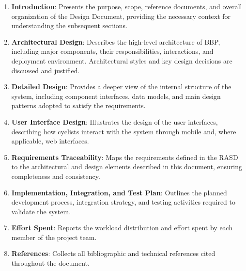 \begin{enumerate}
      \item \textbf{Introduction}: Presents the purpose, scope, reference documents, and
            overall organization of the Design Document, providing the necessary context
            for understanding the subsequent sections.
      \item \textbf{Architectural Design}: Describes the high-level architecture of BBP,
            including major components, their responsibilities, interactions, and
            deployment environment. Architectural styles and key design decisions are
            discussed and justified.
      \item \textbf{Detailed Design}: Provides a deeper view of the internal structure of
            the system, including component interfaces, data models, and main design
            patterns adopted to satisfy the requirements.
      \item \textbf{User Interface Design}: Illustrates the design of the user interfaces,
            describing how cyclists interact with the system through mobile and, where
            applicable, web interfaces.
      \item \textbf{Requirements Traceability}: Maps the requirements defined in the RASD
            to the architectural and design elements described in this document, ensuring
            completeness and consistency.
      \item \textbf{Implementation, Integration, and Test Plan}: Outlines the planned
            development process, integration strategy, and testing activities required to
            validate the system.
      \item \textbf{Effort Spent}: Reports the workload distribution and effort spent by
            each member of the project team.
      \item \textbf{References}: Collects all bibliographic and technical references cited
            throughout the document.
\end{enumerate}
